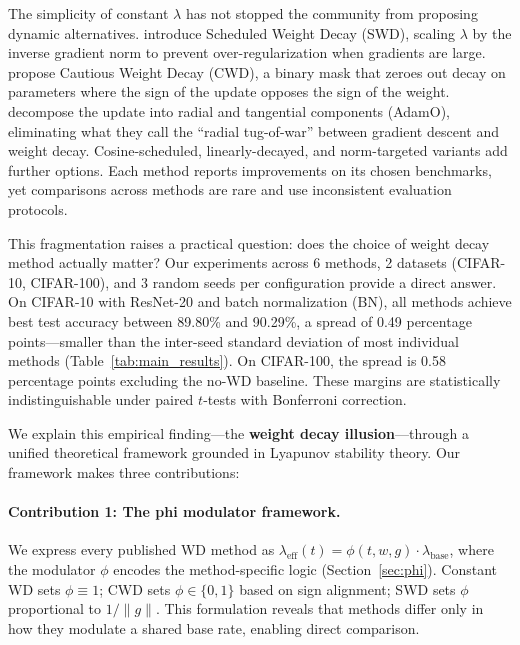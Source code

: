 \documentclass{article}
\begin{document}
The simplicity of constant $\lambda$ has not stopped the community from proposing dynamic alternatives. \citet{xie2023swd} introduce Scheduled Weight Decay (SWD), scaling $\lambda$ by the inverse gradient norm to prevent over-regularization when gradients are large. \citet{chen2026cwd} propose Cautious Weight Decay (CWD), a binary mask that zeroes out decay on parameters where the sign of the update opposes the sign of the weight. \citet{chen2026adamo} decompose the update into radial and tangential components (AdamO), eliminating what they call the ``radial tug-of-war'' between gradient descent and weight decay. Cosine-scheduled, linearly-decayed, and norm-targeted variants add further options. Each method reports improvements on its chosen benchmarks, yet comparisons across methods are rare and use inconsistent evaluation protocols.

This fragmentation raises a practical question: does the choice of weight decay method actually matter? Our experiments across 6 methods, 2 datasets (CIFAR-10, CIFAR-100), and 3 random seeds per configuration provide a direct answer. On CIFAR-10 with ResNet-20 and batch normalization (BN), all methods achieve best test accuracy between 89.80\% and 90.29\%, a spread of 0.49 percentage points---smaller than the inter-seed standard deviation of most individual methods (Table~\ref{tab:main_results}). On CIFAR-100, the spread is 0.58 percentage points excluding the no-WD baseline. These margins are statistically indistinguishable under paired $t$-tests with Bonferroni correction.

We explain this empirical finding---the \textbf{weight decay illusion}---through a unified theoretical framework grounded in Lyapunov stability theory. Our framework makes three contributions:

\paragraph{Contribution 1: The phi modulator framework.} We express every published WD method as $\lambda_{\text{eff}}(t) = \phi(t, w, g) \cdot \lambda_{\text{base}}$, where the modulator $\phi$ encodes the method-specific logic (Section~\ref{sec:phi}). Constant WD sets $\phi \equiv 1$; CWD sets $\phi \in \{0, 1\}$ based on sign alignment; SWD sets $\phi$ proportional to $1/\|g\|$. This formulation reveals that methods differ only in how they modulate a shared base rate, enabling direct comparison.
\end{document}
